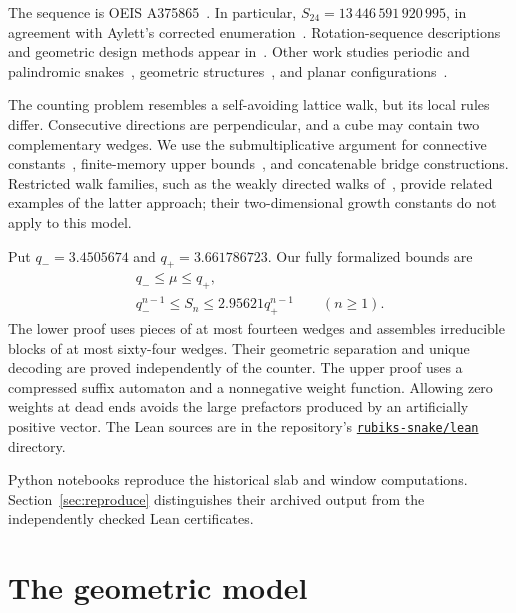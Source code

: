 \documentclass[conference]{IEEEtran}
\newcommand{\qminus}{q_-}
\newcommand{\qplus}{q_+}
\begin{document}
The sequence is OEIS A375865~\cite{oeisA375865}. In particular,
$S_{24}=13\,446\,591\,920\,995$, in agreement with Aylett's
corrected enumeration~\cite{aylett2011}. Rotation-sequence descriptions
and geometric design methods appear in~\cite{li2020,soul2022}.
Other work studies periodic and palindromic
snakes~\cite{palindromic2021}, geometric
structures~\cite{chen2023}, and planar configurations~\cite{grotto2024}.

The counting problem resembles a self-avoiding lattice walk, but its
local rules differ. Consecutive directions are perpendicular, and a
cube may contain two complementary wedges. We use the submultiplicative
argument for connective constants~\cite{hammersley1957}, finite-memory
upper bounds~\cite{alm1993,noonan1998,ponitz2000,he2025}, and
concatenable bridge constructions. Restricted walk families, such as
the weakly directed walks of~\cite{bacher2011}, provide related examples
of the latter approach; their two-dimensional growth constants do not
apply to this model.

Put $\qminus=3.4505674$ and $\qplus=3.661786723$.
Our fully formalized bounds are
\begin{equation}\label{eq:formal-bounds}
 \boxed{\begin{gathered}
  \qminus\leq\mu\leq\qplus,\\
  \qminus^{n-1}\leq S_n\leq2.95621\qplus^{n-1}
  \qquad(n\geq1).
 \end{gathered}}
\end{equation}
The lower proof uses pieces of at most fourteen wedges and assembles
irreducible blocks of at most sixty-four wedges. Their geometric
separation and unique decoding are proved independently of the counter.
The upper proof uses a compressed suffix automaton and a
nonnegative weight function. Allowing zero weights at dead ends avoids
the large prefactors produced by an artificially positive vector.
The Lean sources are in the repository's
\href{https://github.com/fedimser/math/tree/master/rubiks-snake/lean}
{\texttt{rubiks-snake/lean}} directory.

Python notebooks reproduce the historical slab and window computations.
Section~\ref{sec:reproduce} distinguishes their archived output from
the independently checked Lean certificates.

\section{The geometric model}\label{sec:geometry}
\end{document}
